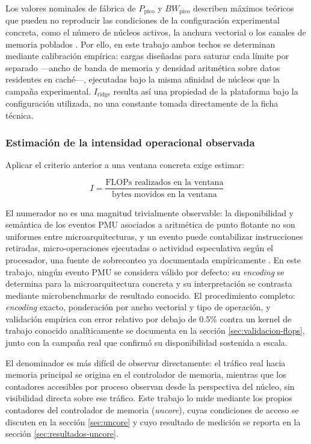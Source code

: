 \documentclass[12pt,oneside,spanish]{book}
\begin{document}
Los valores nominales de fábrica de $P_{\text{pico}}$ y
$BW_{\text{pico}}$ describen máximos teóricos que pueden no reproducir las
condiciones de la configuración experimental concreta, como el número de
núcleos activos, la anchura vectorial o los canales de memoria poblados
\cite{NERSC2026}. Por ello, en este trabajo ambos techos se determinan
mediante calibración empírica: cargas diseñadas para saturar cada límite
por separado ---ancho de banda de memoria y densidad aritmética sobre
datos residentes en caché---, ejecutadas bajo la misma afinidad de núcleos
que la campaña experimental. $I_{\text{ridge}}$ resulta así una propiedad
de la plataforma bajo la configuración utilizada, no una constante tomada
directamente de la ficha técnica.
\subsubsection{Estimación de la intensidad operacional observada}
\label{sec:intensidad}

Aplicar el criterio anterior a una ventana concreta exige estimar:

\begin{equation}
I = \frac{\text{FLOPs realizados en la ventana}}{\text{bytes movidos en la ventana}}
\label{eq:intensidad}
\end{equation}

El numerador no es una magnitud trivialmente observable: la disponibilidad y semántica de los eventos PMU asociados a aritmética de punto flotante no son uniformes entre microarquitecturas, y un evento puede contabilizar instrucciones retiradas, micro-operaciones ejecutadas o actividad especulativa según el procesador, una fuente de sobreconteo ya documentada empíricamente \cite{Weaver2008}. En este trabajo, ningún evento PMU se considera válido por defecto: su \textit{encoding} se determina para la microarquitectura concreta y su interpretación se contrasta mediante microbenchmarks de resultado conocido. El procedimiento completo: \textit{encoding} exacto, ponderación por ancho vectorial y tipo de operación, y validación empírica con error relativo por debajo de 0.5\% contra un kernel de trabajo conocido analíticamente se documenta en la sección \ref{sec:validacion-flops}, junto con la campaña real que confirmó su disponibilidad sostenida a escala.

El denominador es más difícil de observar directamente: el tráfico real hacia memoria principal se origina en el controlador de memoria, mientras que los contadores accesibles por proceso observan desde la perspectiva del núcleo, sin visibilidad directa sobre ese tráfico. Este trabajo lo mide mediante los propios contadores del controlador de memoria (\textit{uncore}), cuyas condiciones de acceso se discuten en la sección \ref{sec:uncore} y cuyo resultado de medición se reporta en la sección \ref{sec:resultados-uncore}.
\end{document}
